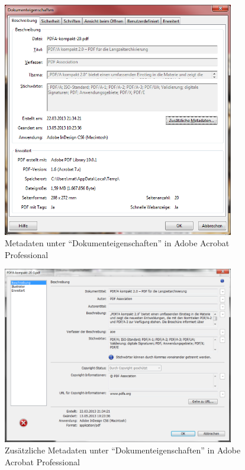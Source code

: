 \begin{figure}[h!tb]
  \begin{center}
    \includegraphics[width=0.9\textwidth]{bilder/PDF_dokumenteigenschaften}
  \end{center}
  \caption{Metadaten unter "`Dokumenteigenschaften"' in Adobe Acrobat Professional}
  \label{abb:PDFeigenschaften}
\end{figure}

\begin{figure}[h!bt]
  \begin{center}
    \includegraphics[width=0.9\textwidth]{bilder/PDF_dokumenteigenschaften_zusatz}
  \end{center}
  \caption{Zusätzliche Metadaten unter "`Dokumenteigenschaften"' in Adobe Acrobat Professional}
  \label{abb:PDFeigenschaftenZusatz}
\end{figure}

